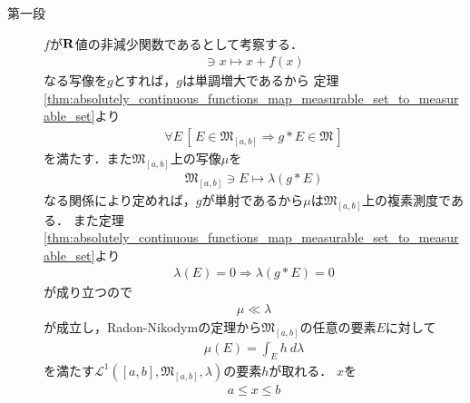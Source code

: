 	\begin{screen}
		\begin{thm}[絶対連続関数の総変動関数も絶対連続である]
			
		\end{thm}
	\end{screen}
	
	\begin{screen}
		\begin{thm}[微分積分学の基本定理]\label{thm:the_fundamental_theorem_of_calculus}
		\end{thm}
	\end{screen}
	
	\begin{sketch}\mbox{}
		\begin{description}
			\item[第一段]
				$f$が$\mathbf{R}$値の非減少関数であるとして考察する．
				\begin{align}
					[\alpha,\beta] \ni x \longmapsto x + f(x)
				\end{align}
				なる写像を$g$とすれば，$g$は単調増大であるから
				定理\ref{thm:absolutely_continuous_functions_map_measurable_set_to_measurable_set}より
				\begin{align}
					\forall E\, \left[\, E \in \mathfrak{M}_{[a,b]} \Longrightarrow g \ast E \in \mathfrak{M}\, \right]
				\end{align}
				を満たす．また$\mathfrak{M}_{[a,b]}$上の写像$\mu$を
				\begin{align}
					\mathfrak{M}_{[a,b]} \ni E \longmapsto \lambda(g \ast E)
				\end{align}
				なる関係により定めれば，$g$が単射であるから$\mu$は$\mathfrak{M}_{[a,b]}$上の複素測度である．
				また定理\ref{thm:absolutely_continuous_functions_map_measurable_set_to_measurable_set}より
				\begin{align}
					\lambda(E) = 0 \Longrightarrow \lambda(g \ast E) = 0
				\end{align}
				が成り立つので
				\begin{align}
					\mu \ll \lambda
				\end{align}
				が成立し，Radon-Nikodymの定理から$\mathfrak{M}_{[a,b]}$の任意の要素$E$に対して
				\begin{align}
					\mu(E) = \int_E h\ d\lambda
				\end{align}
				を満たす$\mathscr{L}^1([a,b],\mathfrak{M}_{[a,b]},\lambda)$の要素$h$が取れる．
				$x$を
				\begin{align}
					a \leq x \leq b
				\end{align}

\end{description}
\end{sketch}
